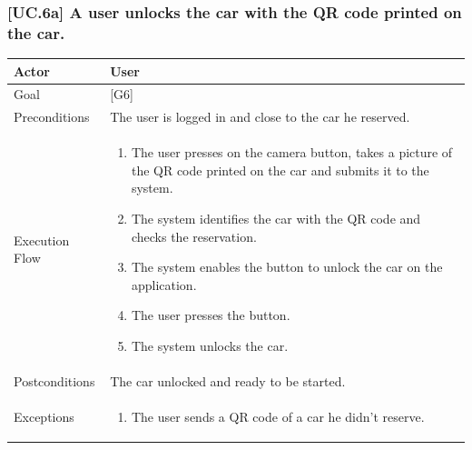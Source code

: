\documentclass[english]{article}
\begin{document}
	\subsubsection{[UC.6a] A user unlocks the car with the QR code printed on the car.}
	\begin{tabularx}{\textwidth}{  l  X  }
		\hline
		Actor & User\\
		\hline
		Goal & [G6]\\
		\hline
		Preconditions & The user is logged in and close to the car he reserved.\\
		\hline
		Execution Flow & \begin{enumerate}
			\item{The user presses on the camera button, takes a picture of the QR code printed on the car and submits it to the system.}
			\item{The system identifies the car with the QR code and checks the reservation.}
			\item{The system enables the button to unlock the car on the application.}
			\item{The user presses the button.}
			\item{The system unlocks the car.}
		\end{enumerate}\\
		\hline
		Postconditions & The car unlocked and ready to be started.\\
		\hline
		Exceptions & \begin{enumerate}
			\item{The user sends a QR code of a car he didn't reserve.}
		\end{enumerate}\\
		\hline
	\end{tabularx}
\end{document}
